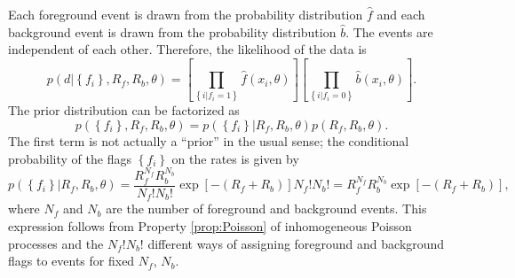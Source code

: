 \documentclass[aps,prd]{revtex4-1}
\newcommand{\mathset}[1]{\left\{ #1 \right\}}
\begin{document}
Each foreground event is drawn from the probability distribution
$\hat{f}$ and each background event is drawn from the probability
distribution $\hat{b}$.  The events are independent of each other.
Therefore, the likelihood of the data is 
\begin{equation}
  p\left( d | \mathset{f_i}, R_f, R_b, \theta\right)  = \left[
    \prod_{\mathset{i | f_i = 1}} \hat{f}\left(x_i, \theta\right) \right]
  \left[ \prod_{\mathset{i | f_i = 0}} \hat{b}\left( x_i, \theta\right)
  \right].  
\end{equation}
The prior distribution can be factorized as
\begin{equation}
  \label{eq:combined-flag-rate-prior}
  p\left(\mathset{f_i}, R_f, R_b, \theta\right)  = p\left(
    \mathset{f_i} | R_f, R_b, \theta\right)p(R_f, R_b, \theta).
\end{equation}
The first term is not actually a ``prior'' in the usual sense; the
conditional probability of the flags $\mathset{f_i}$ on the rates is given
by
\begin{equation}
  \label{eq:flag-conditional-prior}
  p\left(\mathset{f_i} | R_f, R_b, \theta\right) = \frac{R_f^{N_f}
    R_b^{N_b}}{N_f! N_b!} \exp\left[ - \left(R_f + R_b\right) \right]
  N_f! N_b! = R_f^{N_f}R_b^{N_b} \exp\left[ - \left(R_f + R_b\right) \right],
\end{equation}
where $N_f$ and $N_b$ are the number of foreground and background
events.  This expression follows from Property \ref{prop:Poisson} of
inhomogeneous Poisson processes and the $N_f! N_b!$ different ways of
assigning foreground and background flags to events for fixed $N_f$,
$N_b$.  
\end{document}
